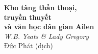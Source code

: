 \begin{titlepage}
  \begin{center}
    \Huge\textbf{Kho tàng thần thoại,}\\
    \Huge\textbf{truyền thuyết}\\
    \Huge\textbf{và văn học dân gian Ailen}\\
    \Large\textit{W.B. Yeats \& Lady Gregory}\\
    \large{Đức Phát (dịch)}
  \end{center}
\end{titlepage}
